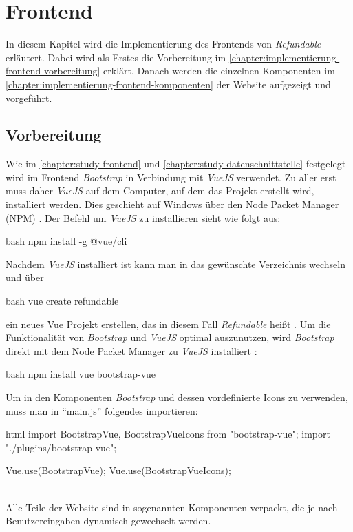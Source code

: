 \section{Frontend}
\label{chapter:implementierung-frontend}
In diesem Kapitel wird die Implementierung des Frontends von \textit{Refundable} erläutert. Dabei wird als Erstes die Vorbereitung im \autoref{chapter:implementierung-frontend-vorbereitung} erklärt. Danach werden die einzelnen Komponenten im \autoref{chapter:implementierung-frontend-komponenten} der Website aufgezeigt und vorgeführt.
\subsection{Vorbereitung}
\label{chapter:implementierung-frontend-vorbereitung}
Wie im \autoref{chapter:study-frontend} und \autoref{chapter:study-datenschnittstelle} festgelegt wird im Frontend \textit{Bootstrap} in Verbindung mit \textit{VueJS} verwendet. Zu aller erst muss daher \textit{VueJS} auf dem Computer, auf dem das Projekt erstellt wird, installiert werden. Dies geschieht auf Windows über den Node Packet Manager (NPM) \cite{vue-install}. Der Befehl um \textit{VueJS} zu installieren sieht wie folgt aus:
\begin{code}{bash}
	npm install -g @vue/cli
\end{code}
Nachdem \textit{VueJS} installiert ist kann man in das gewünschte Verzeichnis wechseln und über
\begin{code}{bash}
	vue create refundable
\end{code}
ein neues Vue Projekt erstellen, das in diesem Fall \textit{Refundable} heißt \cite{vue-create-project}. Um die Funktionalität von \textit{Bootstrap} und \textit{VueJS} optimal auszunutzen, wird \textit{Bootstrap} direkt mit dem Node Packet Manager zu \textit{VueJS} installiert \cite{bootstrap-vue-getting-started}:
\begin{code}{bash}
	npm install vue bootstrap-vue
\end{code}
Um in den Komponenten \textit{Bootstrap} und dessen vordefinierte Icons zu verwenden, muss man in \enquote{main.js} folgendes importieren:
\begin{code}{html}
	import { BootstrapVue, BootstrapVueIcons } from "bootstrap-vue";
	import "./plugins/bootstrap-vue";
	
	Vue.use(BootstrapVue);
	Vue.use(BootstrapVueIcons);
\end{code}
	\label{list:requcommands} ~\\
Alle Teile der Website sind in sogenannten Komponenten verpackt, die je nach Benutzereingaben dynamisch gewechselt werden. 

